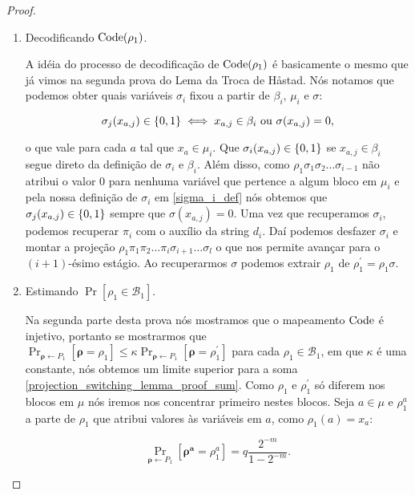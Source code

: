 \begin{proof}
\begin{enumerate}
	\item Decodificando $\text{Code}(\rho_{1})$.

	A idéia do processo de decodificação de $\text{Code}(\rho_{1})$ é basicamente o mesmo que já vimos na segunda prova do Lema da Troca de Håstad. Nós notamos que podemos obter quais variáveis $\sigma_{i}$ fixou a partir de $\beta_{i}$, $\mu_{i}$ e $\sigma$:
	
	\begin{equation*}
		\sigma_{j}(x_{a, j}) \in \{0, 1\} \iff x_{a, j} \in \beta_{i} \text{ ou } \sigma(x_{a, j}) = 0,
	\end{equation*}

	o que vale para cada $a$ tal que $x_{a} \in \mu_{i}$. Que $\sigma_{i}(x_{a, j}) \in \{0, 1\}$ se $x_{a, j} \in \beta_{i}$ segue direto da definição de $\sigma_{i}$ e $\beta_{i}$. Além disso, como $\rho_{1}\sigma_{1}\sigma_{2}\dots\sigma_{i - 1}$ não atribui o valor 0 para nenhuma variável que pertence a algum bloco em $\mu_{i}$ e pela nossa definição de $\sigma_{i}$ em \ref{sigma_i_def} nós obtemos que $\sigma_{j}(x_{a, j}) \in \{0, 1\}$ sempre que $\sigma(x_{a, j}) = 0$. Uma vez que recuperamos $\sigma_{i}$, podemos recuperar $\pi_{i}$ com o auxílio da string $d_{i}$. Daí podemos desfazer $\sigma_{i}$ e montar a projeção $\rho_{1}\pi_{1}\pi_{2}\dots\pi_{i}\sigma_{i + 1}\dots\sigma_{l}$ o que nos permite avançar para o $(i + 1)$-ésimo estágio. Ao recuperarmos $\sigma$ podemos extrair $\rho_{1}$ de $\rho_{1}^{\prime} = \rho_{1}\sigma$.
	
	\item Estimando $\Pr[\rho_{1} \in \mathcal{B}_{1}]$.
	
	Na segunda parte desta prova nós mostramos que o mapeamento $\text{Code}$ é injetivo, portanto se mostrarmos que $\Pr_{\boldsymbol{\rho} \leftarrow P_{1}}[\boldsymbol{\rho} = \rho_{1}] \leq \kappa\Pr_{\boldsymbol{\rho} \leftarrow P_{1}}[\boldsymbol{\rho} = \rho_{1}^{\prime}]$ para cada $\rho_{1} \in \mathcal{B}_{1}$, em que $\kappa$ é uma constante, nós obtemos um limite superior para a soma \ref{projection_switching_lemma_proof_sum}. Como $\rho_{1}$ e $\rho_{1}^{\prime}$ só diferem nos blocos em $\mu$ nós iremos nos concentrar primeiro nestes blocos. Seja $a \in \mu$ e $\rho_{1}^{a}$ a parte de $\rho_{1}$ que atribui valores às variáveis em $a$, como $\rho_{1}(a) = x_{a}$:
	
	\begin{equation*}
		\Pr_{\boldsymbol{\rho} \leftarrow P_{1}}[\boldsymbol{\rho^{a}} = \rho_{1}^{a}] = q\frac{2^{-m}}{1 - 2^{-m}}.
	\end{equation*}


\end{enumerate}
\end{proof}

